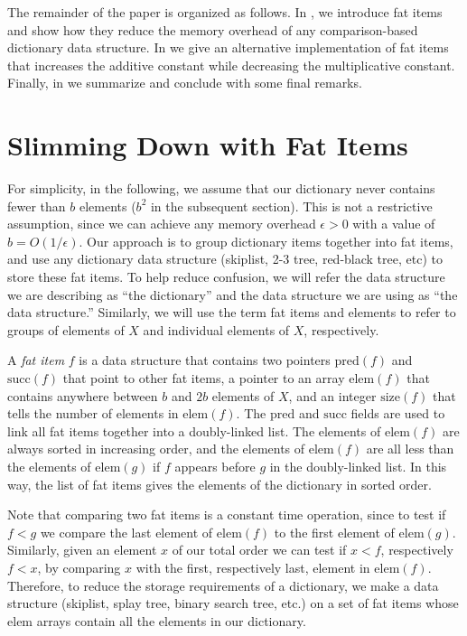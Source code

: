 \documentclass[lotsofwhite]{patmorin}
\begin{document}
The remainder of the paper is organized as follows.  In
, we introduce fat items and show how they reduce the
memory overhead of any comparison-based dictionary data structure.  In
 we give an alternative implementation of fat items that
increases the additive constant while decreasing the multiplicative
constant.  Finally, in  we summarize and conclude
with some final remarks.


\section{Slimming Down with Fat Items}

\newcommand{\scc}{\mathrm{succ}} \newcommand{\prd}{\mathrm{pred}}
\newcommand{\elm}{\mathrm{elem}} \newcommand{\sz}{\mathrm{size}}

For simplicity, in the following, we assume that our dictionary never
contains fewer than $b$ elements ($b^2$ in the subsequent section).
This is not a restrictive assumption, since we can achieve any memory
overhead $\epsilon>0$ with a value of $b=O(1/\epsilon)$.  Our approach
is to group dictionary items together into fat items, and use any
dictionary data structure (skiplist, 2-3 tree, red-black tree, etc) to
store these fat items.  To help reduce confusion, we will refer the
data structure we are describing as ``the dictionary'' and the data
structure we are using as ``the data structure.''  Similarly, we will
use the term fat items and elements to refer to groups of elements of
$X$ and individual elements of $X$, respectively.

A \emph{fat item} $f$ is a data structure that contains two pointers
$\prd(f)$ and $\scc(f)$ that point to other fat items, a pointer to an
array $\elm(f)$ that contains anywhere between $b$ and $2b$ elements
of $X$, and an integer $\sz(f)$ that tells the number of elements in
$\elm(f)$.  The $\prd$ and $\scc$ fields are used to link all fat
items together into a doubly-linked list.  The elements of $\elm(f)$
are always sorted in increasing order, and the elements of $\elm(f)$
are all less than the elements of $\elm(g)$ if $f$ appears before $g$
in the doubly-linked list.  In this way, the list of fat items gives
the elements of the dictionary in sorted order.

Note that comparing two fat items is a constant time operation, since
to test if $f<g$ we compare the last element of $\elm(f)$ to the first
element of $\elm(g)$.  Similarly, given an element $x$ of our total
order we can test if $x<f$, respectively $f<x$, by comparing $x$ with
the first, respectively last, element in $\elm(f)$.  Therefore, to
reduce the storage requirements of a dictionary, we make a data
structure (skiplist, splay tree, binary search tree, etc.) on a set of
fat items whose $\elm$ arrays contain all the elements in our
dictionary.
\end{document}
